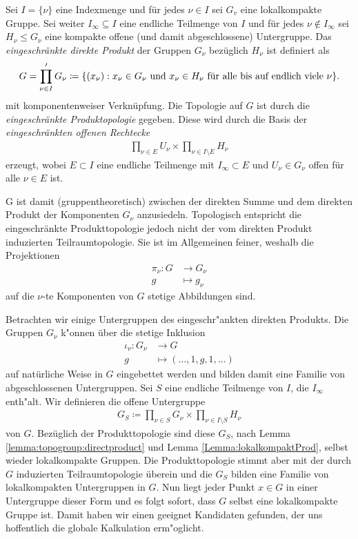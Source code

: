 		\begin{defi}
			Sei $I=\{\nu\}$ eine Indexmenge und für jedes $\nu \in I$ sei $G_v$ eine lokalkompakte Gruppe. 
			Sei weiter $I_\infty \subseteq I$ eine endliche Teilmenge von $I$ und für jedes $\nu \notin I_\infty$ sei $H_\nu\leq G_\nu$ eine kompakte offene (und damit abgeschlossene) Untergruppe. 
			Das \emph{eingeschränkte direkte Produkt} der Gruppen $G_\nu$ bezüglich $H_\nu$ ist definiert als 
			\begin{align*}
				G = \prod\limits_{\nu \in I}' G_\nu \coloneqq \{ (x_\nu): x_\nu \in G_\nu \text{ und } x_\nu \in H_\nu \text{ für alle bis auf endlich viele } \nu \}.
			\end{align*}
			mit komponentenweiser Verknüpfung. 
			Die Topologie auf $G$ ist durch die \emph{eingeschränkte Produktopologie}  gegeben. 
			Diese wird durch die Basis der \emph{eingeschränkten offenen Rechtecke}
			\begin{align*}
				\prod_{\nu\in E} U_\nu \times \prod_{\nu\in I\setminus E} H_\nu
			\end{align*}
			erzeugt, wobei $E \subset I$ eine endliche Teilmenge mit $I_\infty \subset E$ und $U_\nu \in G_\nu$ offen für alle $\nu\in E$ ist.
		\end{defi}
		G ist damit (gruppentheoretisch) zwischen der direkten Summe und dem direkten Produkt der Komponenten $G_\nu$ anzusiedeln.
		Topologisch entspricht die eingeschränkte Produkttopologie jedoch nicht der vom direkten Produkt induzierten Teilraumtopologie.
		Sie ist im Allgemeinen feiner, weshalb die Projektionen
		\begin{align*}
			\pi_\nu: G &\to G_\nu\\
					g &\mapsto g_\nu
		\end{align*}
		auf die $\nu$-te Komponenten von $G$ stetige Abbildungen sind.
		
		Betrachten wir einige Untergruppen des eingeschr"ankten direkten Produkts.
		Die Gruppen $G_\nu$ k"onnen über die stetige Inklusion 
		\begin{align*}
			\iota_\nu: G_\nu &\to G \\
					g &\mapsto (\dots,1,g,1,\dots)
		\end{align*}
		auf natürliche Weise in $G$ eingebettet werden und bilden damit eine Familie von abgeschlossenen Untergruppen.
		Sei $S$ eine endliche Teilmenge von $I$, die $I_\infty$ enth"alt. 
		Wir definieren die offene Untergruppe
		\begin{align*}
			G_S \coloneqq \prod_{\nu\in S}G_\nu \times \prod_{\nu\in I\setminus S} H_\nu
		\end{align*}
		von $G$. 
		Bezüglich der Produkttopologie sind diese $G_S$, nach Lemma \ref{lemma:topogroup:directproduct} und Lemma \ref{Lemma:lokalkompaktProd}, selbst wieder lokalkompakte Gruppen.
		Die Produkttopologie stimmt aber mit der durch $G$ induzierten Teilraumtopologie überein und die $G_S$ bilden eine Familie von lokalkompakten Untergruppen in $G$.
		Nun liegt jeder Punkt $x \in G$ in einer Untergruppe dieser Form und es folgt sofort, dass $G$ selbst eine lokalkompakte Gruppe ist.
		Damit haben wir einen geeignet Kandidaten gefunden, der uns hoffentlich die globale Kalkulation erm"oglicht.
		
